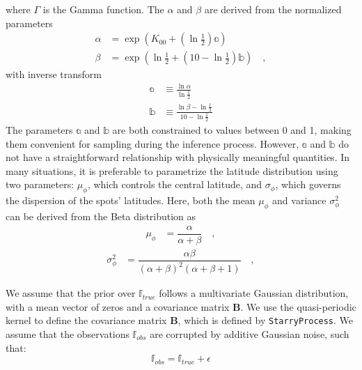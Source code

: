 \documentclass[twocolumn]{aastex631}
\begin{document}
%
where $\Gamma$ is the Gamma function. The $\alpha$ and $\beta$ are derived from the normalized parameters 
%
\begin{align}
    \label{eq:beta2gauss}
    \alpha & = \exp\left({K_{00} + (\ln\frac{1}{2})\mathbb{a}}\right)
    \nonumber                                                 \\
    \beta  & = \exp\left({\ln\frac{1}{2} + (10 - \ln\frac{1}{2})\mathbb{b}}\right)
    \quad,
\end{align}
%
with inverse transform
%
\begin{align}
    \label{eq:gauss2beta}
    \mathbb{a} & \equiv \frac{\ln\alpha}{\ln\frac{1}{2}}
    \nonumber                                             \\[0.5em]
    \mathbb{b} & \equiv \frac{\ln\beta - \ln\frac{1}{2}}{10 -\ln\frac{1}{2}}
\end{align}
%
The parameters $\mathbb{a}$ and $\mathbb{b}$ are both constrained to values between 0 and 1, making them convenient for sampling during the inference process. 
However, $\mathbb{a}$ and $\mathbb{b}$ do not have a straightforward relationship with physically meaningful quantities. In many situations, it is preferable to parametrize 
the latitude distribution using two parameters: $\mu_\phi$, which controls the central latitude, and $\sigma_\phi$, which governs the dispersion of the 
spots' latitudes. Here, both the mean $\mu_\phi$ and variance $\sigma^2_\phi$ can be derived from the Beta distribution as
%
\begin{align}
    \label{eq:mean_beta}
    \mu_\phi
     & =
    \dfrac{\alpha}{\alpha+\beta}
    \quad,
\end{align}
%
\begin{align}
    \label{eq:var_beta}
    \sigma^2_\phi
     & =
    \dfrac{\alpha\beta}{(\alpha+\beta)^2(\alpha+\beta+1)}
    \quad,
\end{align}
%

We assume that the prior over $\mathbb{f}_{true}$ follows a multivariate Gaussian distribution, with a mean vector of zeros and a covariance 
matrix $\pmb{B}$. We use the quasi-periodic kernel to define the covariance matrix $\pmb{B}$, which is defined by \texttt{StarryProcess}.
We assume that the observations $\mathbb{f}_{obs}$ are corrupted by additive Gaussian noise, such that:
\begin{equation}
    \mathbb{f}_{obs} = \mathbb{f}_{true} + \epsilon
\end{equation}
\end{document}
